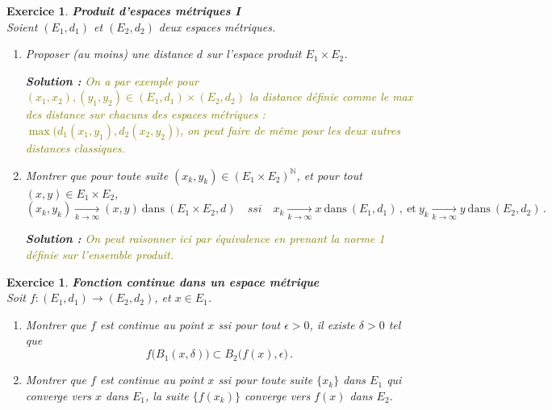 \documentclass[11pt,a4paper]{article}
\newcommand{\N}{\mathbb{N}}
\newcommand{\parent}[1]{\bigl(#1\bigr)}
\newcounter{ex}
\newtheorem{exs}[ex]{Exercice}
\newenvironment{exo}{\begin{exs}\rm}{\end{exs}\vspace{.1cm}}
\newcommand{\solution}[1]{\par\noindent\textbf{\color{olive}Solution :} \textcolor{olive}{#1}}
\begin{document}
\begin{exo} \textbf{Produit d'espaces métriques I}\\

Soient $(E_1,d_1)$ et $(E_2,d_2)$ deux espaces métriques. 
\begin{enumerate}
\item Proposer (au moins) une distance $d$ sur l'espace produit $E_1\times E_2$.
	\solution{On a par exemple pour $(x_1,x_2),(y_1,y_2) \in (E_1,d_1)\times(E_2,d_2)$ la distance définie comme le max des distance sur chacuns des espaces métriques : $\max \big( d_1(x_1,y_1), d_2(x_2,y_2) \big)$, on peut faire de même pour les deux autres distances classiques.}
\item Montrer que pour toute suite $(x_k,y_k)\in (E_1\times E_2)^\N$, et pour tout $(x,y)\in E_1\times E_2$,
\[
(x_k,y_k) \underset{k\to\infty}{\longrightarrow} (x,y)\  \text{dans}\ (E_1\times E_2, d)
\quad \textit{ssi}\quad 
x_k \underset{k\to\infty}{\longrightarrow} x\  \text{dans}\ (E_1,d_1)\,,\ \text{et}\ y_k \underset{k\to\infty}{\longrightarrow} y\  \text{dans}\ (E_2,d_2)\,.
\]
		\solution{On peut raisonner ici par équivalence en prenant la norme 1 définie sur l'ensemble produit.}
\end{enumerate}
\end{exo}

\begin{exo}\textbf{Fonction continue dans un espace métrique}\\

Soit $f: (E_1,d_1)\to (E_2,d_2)$, et $x\in E_1$. 
\begin{enumerate}
    \item Montrer que $f$ est continue au point $x$ \textit{ssi} pour tout $\epsilon>0$, il existe $\delta>0$ tel que 
\[
f\parent{B_1(x,\delta)}\subset B_2\parent{f(x),\epsilon}\,.
\]
\item Montrer que $f$ est continue au point $x$ \textit{ssi} pour toute suite 
$\{ x_k \}$ dans $E_1$ qui converge vers $x$ dans $E_1$, la suite $\{ f(x_k) \}$ converge vers $f(x)$ dans $E_2$.

\end{enumerate}
\end{exo}
\end{document}
